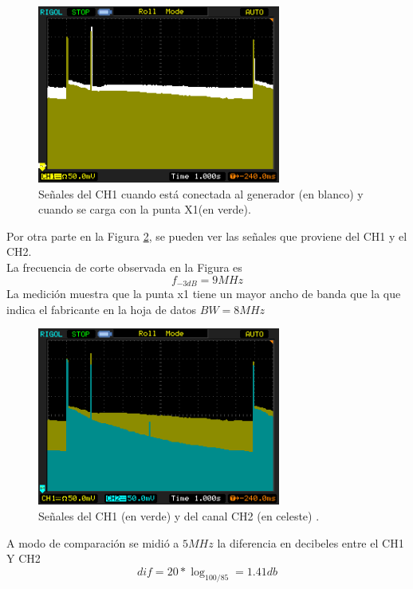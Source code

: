 \documentclass[a4paper,10pt]{article}
\begin{document}
		\begin{figure}[!htb]
			\centering
			\includegraphics[width=8cm]
			{Imagenes/Mediciones instrumentos/NewFile4.png}
			\caption{Se\~nales del CH1 cuando est\'a conectada al generador 
			(en blanco) y cuando se carga con la punta X1(en verde).} 
			\label{img003}
		\end{figure}
		
		\indent Por otra parte en la Figura \ref{img002}, se pueden ver las 
		se\~nales que proviene del CH1 y el CH2. \\
		\indent La frecuencia de corte observada en la Figura es 
		$$f_{-3dB}=9MHz$$
		\indent La medición muestra que la punta x1 tiene un mayor ancho de 
		banda que la que indica el fabricante en la hoja de datos
		$BW = 8 MHz$
		\begin{figure}[!htb]
			\centering
			\includegraphics[width=8cm]
			{Imagenes/Mediciones instrumentos/NewFile3.png}
			\caption{Se\~nales del CH1 (en verde) y del canal CH2 (en celeste)
			.} \label{img002}
		\end{figure}						
	
		\indent A modo de comparación se midió a $5 MHz$ la diferencia en 
		decibeles entre el CH1 Y CH2 $$dif = 20*\log_{100/85}  = 1.41db $$
\end{document}
